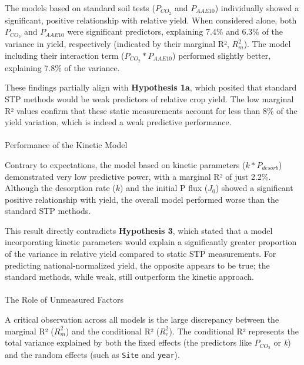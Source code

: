 \documentclass[
  a4paper,
]{article}
\makeatletter
\let\oldparagraph\paragraph
\renewcommand{\paragraph}{
    \@ifstar
      \xxxParagraphStar
      \xxxParagraphNoStar
  }
\newcommand{\xxxParagraphStar}[1]{\oldparagraph*{#1}\mbox{}}
\newcommand{\xxxParagraphNoStar}[1]{\oldparagraph{#1}\mbox{}}
\makeatother
\begin{document}
The models based on standard soil tests (\(P_{CO_2}\) and \(P_{AAE10}\))
individually showed a significant, positive relationship with relative
yield. When considered alone, both \(P_{CO_2}\) and \(P_{AAE10}\) were
significant predictors, explaining 7.4\% and 6.3\% of the variance in
yield, respectively (indicated by their marginal R², \(R^2_m\)). The
model including their interaction term (\(P_{CO_2}*P_{AAE10}\))
performed slightly better, explaining 7.8\% of the variance.

These findings partially align with \textbf{Hypothesis 1a}, which
posited that standard STP methods would be weak predictors of relative
crop yield. The low marginal R² values confirm that these static
measurements account for less than 8\% of the yield variation, which is
indeed a weak predictive performance.

\paragraph{Performance of the Kinetic
Model}\label{performance-of-the-kinetic-model}

Contrary to expectations, the model based on kinetic parameters
(\(k * P_{desorb}\)) demonstrated very low predictive power, with a
marginal R² of just 2.2\%. Although the desorption rate (\(k\)) and the
initial P flux (\(J_0\)) showed a significant positive relationship with
yield, the overall model performed worse than the standard STP methods.

This result directly contradicts \textbf{Hypothesis 3}, which stated
that a model incorporating kinetic parameters would explain a
significantly greater proportion of the variance in relative yield
compared to static STP measurements. For predicting national-normalized
yield, the opposite appears to be true; the standard methods, while
weak, still outperform the kinetic approach.

\paragraph{The Role of Unmeasured
Factors}\label{the-role-of-unmeasured-factors}

A critical observation across all models is the large discrepancy
between the marginal R² (\(R^2_m\)) and the conditional R² (\(R^2_c\)).
The conditional R² represents the total variance explained by both the
fixed effects (the predictors like \(P_{CO_2}\) or \emph{k}) and the
random effects (such as \texttt{Site} and \texttt{year}).
\end{document}
